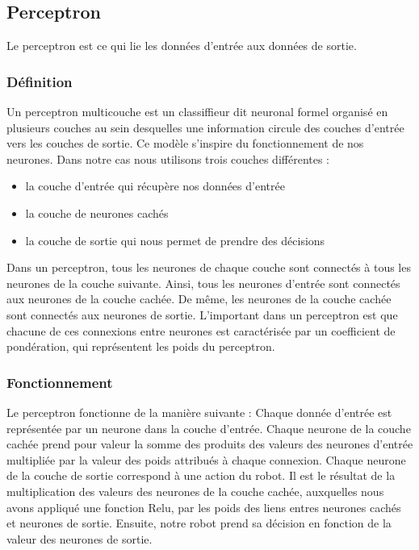 \documentclass[12pt]{article}
\begin{document}
\subsection{Perceptron}
Le perceptron est ce qui lie les données d'entrée aux données de sortie.

\subsubsection{Définition}
Un perceptron multicouche est un classiffieur dit neuronal formel organisé en
plusieurs couches au sein desquelles une information circule des couches d'entrée
vers les couches de sortie. Ce modèle s'inspire du fonctionnement de nos neurones.
Dans notre cas nous utilisons trois couches différentes :

\begin{itemize}
\item la couche d'entrée qui récupère nos données d'entrée
\item la couche de neurones cachés
\item la couche de sortie qui nous permet de prendre des décisions
\end{itemize}

Dans un perceptron, tous les neurones de chaque couche sont connectés à tous les
neurones de la couche suivante. Ainsi, tous les neurones d'entrée sont connectés
aux neurones de la couche cachée. De même, les neurones de la couche cachée sont
connectés aux neurones de sortie. L'important dans un perceptron est que chacune
de ces connexions entre neurones est caractérisée par un coefficient de pondération,
qui représentent les poids du perceptron. 

\subsubsection{Fonctionnement}
Le perceptron fonctionne de la manière suivante :
Chaque donnée d'entrée est représentée par un neurone dans la couche d'entrée.
Chaque neurone de la couche cachée prend pour valeur la somme des produits des
valeurs des neurones d'entrée multipliée par la valeur des poids attribués à chaque
connexion.
Chaque neurone de la couche de sortie correspond à une action du robot. Il est le
résultat de la multiplication des valeurs des neurones de la couche cachée, auxquelles
nous avons appliqué une fonction Relu, par les poids des liens entres neurones cachés
et neurones de sortie.
Ensuite, notre robot prend sa décision en fonction de la valeur des neurones de sortie.
\end{document}
